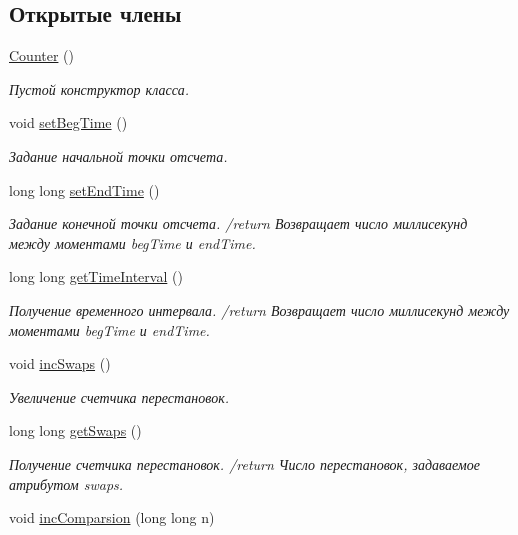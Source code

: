 \subsection*{Открытые члены}
\begin{DoxyCompactItemize}
\item 
\hyperlink{class_counter_a1e05f69b5240fbab3e7ab351672167f0}{Counter} ()
\begin{DoxyCompactList}\small\item\em Пустой конструктор класса. \end{DoxyCompactList}\item 
void \hyperlink{class_counter_a71dea1262b81493aa9734f62a72b2691}{set\+Beg\+Time} ()
\begin{DoxyCompactList}\small\item\em Задание начальной точки отсчета. \end{DoxyCompactList}\item 
long long \hyperlink{class_counter_a338ac4f04d6f5924aa7ace3b14d9ffb9}{set\+End\+Time} ()
\begin{DoxyCompactList}\small\item\em Задание конечной точки отсчета. /return Возвращает число миллисекунд между моментами beg\+Time и end\+Time. \end{DoxyCompactList}\item 
long long \hyperlink{class_counter_a25b1a1a6cd43fb23c2d1563d5b05aec6}{get\+Time\+Interval} ()
\begin{DoxyCompactList}\small\item\em Получение временного интервала. /return Возвращает число миллисекунд между моментами beg\+Time и end\+Time. \end{DoxyCompactList}\item 
void \hyperlink{class_counter_aa0cd30379394257e44aa7afc84ed1fce}{inc\+Swaps} ()
\begin{DoxyCompactList}\small\item\em Увеличение счетчика перестановок. \end{DoxyCompactList}\item 
long long \hyperlink{class_counter_af20f10e30e8bd1d078d1d66c518a814c}{get\+Swaps} ()
\begin{DoxyCompactList}\small\item\em Получение счетчика перестановок. /return Число перестановок, задаваемое атрибутом swaps. \end{DoxyCompactList}\item 
void \hyperlink{class_counter_a224d93150c0fe2982d3efd7aa99668e6}{inc\+Comparsion} (long long n)

\end{DoxyCompactItemize}
